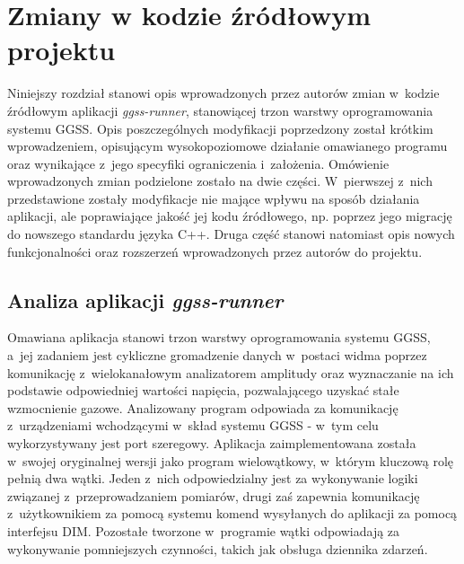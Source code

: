 \chapter{Zmiany w kodzie źródłowym projektu}
\label{cha:code}

\graphicspath{{5_code/static/}}

Niniejszy rozdział stanowi opis wprowadzonych przez autorów zmian w~kodzie źródłowym aplikacji \emph{ggss-runner}, stanowiącej trzon warstwy oprogramowania systemu GGSS. Opis poszczególnych modyfikacji poprzedzony został krótkim wprowadzeniem, opisującym wysokopoziomowe działanie omawianego programu oraz wynikające z~jego specyfiki ograniczenia i~założenia. Omówienie wprowadzonych zmian podzielone zostało na dwie części. W~pierwszej z~nich przedstawione zostały modyfikacje nie mające wpływu na sposób działania aplikacji, ale poprawiające jakość jej kodu źródłowego, np. poprzez jego migrację do nowszego standardu języka C++. Druga część stanowi natomiast opis nowych funkcjonalności oraz rozszerzeń wprowadzonych przez autorów do projektu. 

\section{Analiza aplikacji \emph{ggss-runner}}
Omawiana aplikacja stanowi trzon warstwy oprogramowania systemu GGSS, a~jej zadaniem jest cykliczne gromadzenie danych w~postaci widma poprzez komunikację z~wielokanałowym analizatorem amplitudy oraz wyznaczanie na ich podstawie odpowiedniej wartości napięcia, pozwalającego uzyskać stałe wzmocnienie gazowe. Analizowany program odpowiada za komunikację z~urządzeniami wchodzącymi w~skład systemu GGSS - w~tym celu wykorzystywany jest port szeregowy. Aplikacja zaimplementowana została w~swojej oryginalnej wersji jako program wielowątkowy, w~którym kluczową rolę pełnią dwa wątki. Jeden z~nich odpowiedzialny jest za wykonywanie logiki związanej z~przeprowadzaniem pomiarów, drugi zaś zapewnia komunikację z~użytkownikiem za pomocą systemu komend wysyłanych do aplikacji za pomocą interfejsu DIM. Pozostałe tworzone w~programie wątki odpowiadają za wykonywanie pomniejszych czynności, takich jak obsługa dziennika zdarzeń.

